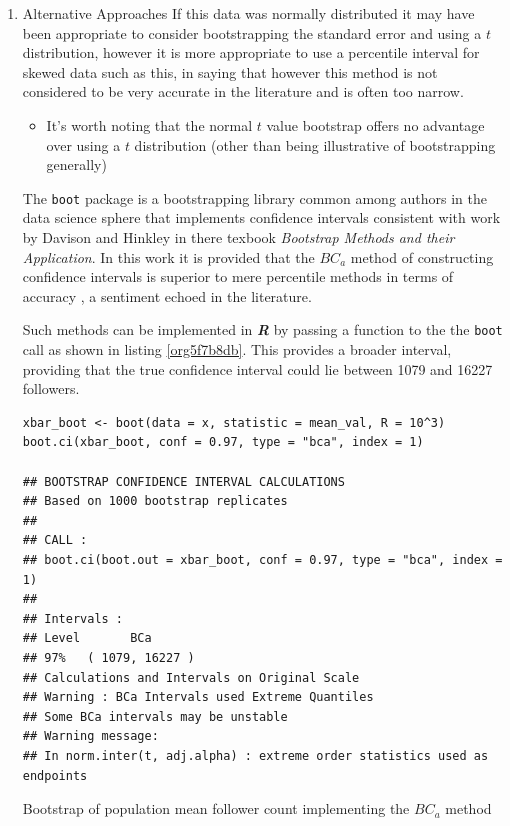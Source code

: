 \documentclass[11pt]{article}
\begin{document}
\begin{enumerate}
\item Alternative Approaches
\label{sec:org466af4e}
If this data was normally distributed it may have been appropriate to consider
bootstrapping the standard error and using a \(t\) distribution, however it is more appropriate to use a
percentile interval for skewed data such as this, in saying that however this method is not considered to be very accurate in the literature and is often too narrow. \cite[Section 4.1]{hesterberg2015}

\begin{itemize}
\item It's worth noting that the normal \(t\) value bootstrap offers no advantage over
using a \(t\) distribution (other than being illustrative of bootstrapping
generally) \cite[Section 4.1]{hesterberg2015}
\end{itemize}


 The \texttt{boot} package is a bootstrapping library common among authors in the data science sphere
 \cite[p. 295]{james2013} \cite[p. 237]{wiley2019} that implements
 confidence intervals consistent with work by Davison and Hinkley
 \cite{ripley2020} in there texbook \emph{Bootstrap Methods and their Application}.
In this work it is provided that the \(BC_{a}\) method of constructing confidence
 intervals is  superior to mere percentile
 methods in terms of accuracy \cite[Ch. 5]{davison1997}, a sentiment echoed in the literature. \cite[Ch. 5]{carpenter2000,davison1997}

Such methods can be implemented in \textbf{\emph{R}} by passing a function to the the \texttt{boot} call as shown in listing \ref{org5f7b8db}. This provides a broader interval, providing that the true confidence interval could lie between 1079 and 16227 followers.

\begin{listing}[htbp]
\begin{verbatim}
xbar_boot <- boot(data = x, statistic = mean_val, R = 10^3)
boot.ci(xbar_boot, conf = 0.97, type = "bca", index = 1)

## BOOTSTRAP CONFIDENCE INTERVAL CALCULATIONS
## Based on 1000 bootstrap replicates
##
## CALL :
## boot.ci(boot.out = xbar_boot, conf = 0.97, type = "bca", index = 1)
##
## Intervals :
## Level       BCa
## 97%   ( 1079, 16227 )
## Calculations and Intervals on Original Scale
## Warning : BCa Intervals used Extreme Quantiles
## Some BCa intervals may be unstable
## Warning message:
## In norm.inter(t, adj.alpha) : extreme order statistics used as endpoints
\end{verbatim}
\caption{\label{org5f7b8db}Bootstrap of population mean follower count implementing the \(BC_{a}\) method}
\end{listing}

\label{org5ce2384}


\label{org9b1d2f2}
 
\end{enumerate}
\end{document}
